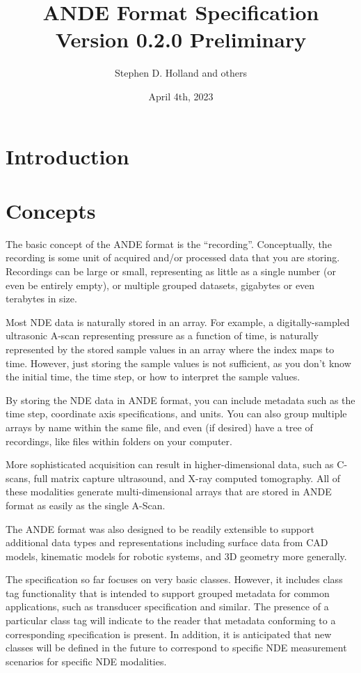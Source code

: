 \documentclass{article}
\title{ANDE Format Specification Version 0.2.0 Preliminary}
\author{Stephen D. Holland and others}
\date{April 4th, 2023}
\begin{document}
\maketitle

\section{Introduction}

\section{Concepts}

The basic concept of the ANDE format is the ``recording''. Conceptually, the recording is some unit of acquired and/or processed data that you are storing. Recordings can be large or small, representing as little as a single number (or even be entirely empty), or multiple grouped datasets, gigabytes or even terabytes in size.

Most NDE data is naturally stored in an array. For example, a digitally-sampled ultrasonic A-scan representing pressure as a function of time, is naturally represented by the stored sample values in an array where the index maps to time. However, just storing the sample values is not sufficient, as you don't know the initial time, the time step, or how to interpret the sample values.

By storing the NDE data in ANDE format, you can include metadata such as the time step, coordinate axis specifications, and units. You can also group multiple arrays by name within the same file, and even (if desired) have a tree of recordings, like files within folders on your computer.

More sophisticated acquisition can result in higher-dimensional data, such as C-scans, full matrix capture ultrasound, and X-ray computed tomography. All of these modalities generate multi-dimensional arrays that are stored in ANDE format as easily as the single A-Scan.

The ANDE format was also designed to be readily extensible to support additional data types and representations including surface data from CAD models, kinematic models for robotic systems, and 3D geometry more generally.

The specification so far focuses on very basic classes. However, it includes class tag functionality that is intended to support grouped metadata for common applications, such as transducer specification and similar. The presence of a particular class tag will indicate to the reader that metadata conforming to a corresponding specification is present. In addition, it is anticipated that new classes will be defined in the future to correspond to specific NDE measurement scenarios for specific NDE modalities.
\end{document}
